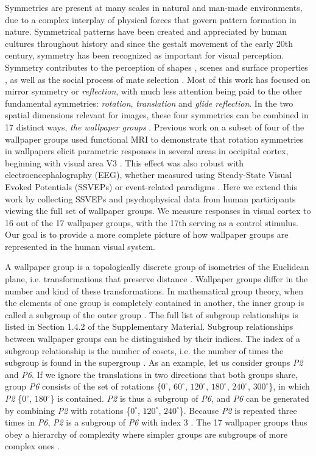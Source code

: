 \documentclass[11pt, twoside]{article}
\begin{document}
Symmetries are present at many scales in natural and man-made environments, due to a complex interplay of physical forces that govern pattern formation in nature. Symmetrical patterns have been created and appreciated by human cultures throughout history and since the gestalt movement of the early 20th century, symmetry has been recognized as important for visual perception. Symmetry contributes to the perception of shapes \cite{RN1311,RN1682}, scenes \cite{RN1824} and surface properties \cite{RN1166}, as well as the social process of mate selection \cite{RN1337}. Most of this work has focused on mirror symmetry or \textit{reflection}, with much less attention being paid to the other fundamental symmetries: \textit{rotation}, \textit{translation} and \textit{glide reflection}. In the two spatial dimensions relevant for images, these four symmetries can be combined in 17 distinct ways, \textit{the wallpaper groups} \cite{RN1562,RN1563,RN1425}. Previous work on a subset of four of the wallpaper groups used functional MRI to demonstrate that rotation symmetries in wallpapers elicit parametric responses in several areas in occipital cortex, beginning with visual area V3 \cite{RN1725}. This effect was also robust with electroencephalography (EEG), whether measured using Steady-State Visual Evoked Potentials (SSVEPs)\cite{RN1725} or event-related paradigms \cite{RN1959}. Here we extend this work by collecting SSVEPs and psychophysical data from human participants viewing the full set of wallpaper groups. We measure responses in visual cortex to 16 out of the 17 wallpaper groups, with the 17th serving as a control stimulus. Our goal is to provide a more complete picture of how wallpaper groups are represented in the human visual system.

A wallpaper group is a topologically discrete group of isometries of the Euclidean plane, i.e. transformations that preserve distance \cite{RN1425}. Wallpaper groups differ in the number and kind of these transformations. In mathematical group theory, when the elements of one group is completely contained in another, the inner group is called a subgroup of the outer group \cite{RN1425}. The full list of subgroup relationships is listed in Section 1.4.2 of the Supplementary Material. Subgroup relationships between wallpaper groups can be distinguished by their indices. The index of a subgroup relationship is the number of cosets, i.e. the number of times the subgroup is found in the supergroup \cite{RN1425}. As an example, let us consider groups \textit{P2} and \textit{P6}. If we ignore the translations in two directions that both groups share, group \textit{P6} consists of the set of rotations \{$0^{\circ}$, $60^{\circ}$, $120^{\circ}$, $180^{\circ}$, $240^{\circ}$, $300^{\circ}$\}, in which \textit{P2} \{$0^{\circ}$, $180^{\circ}$\} is contained. \textit{P2} is thus a subgroup of \textit{P6}, and \textit{P6} can be generated by combining \textit{P2} with rotations \{$0^{\circ}$, $120^{\circ}$, $240^{\circ}$\}. Because \textit{P2} is repeated three times in \textit{P6}, \textit{P2} is a subgroup of \textit{P6} with index 3 \cite{RN1425}. The 17 wallpaper groups thus obey a hierarchy of complexity where simpler groups are subgroups of more complex ones \cite{RN1711}. 
\end{document}
